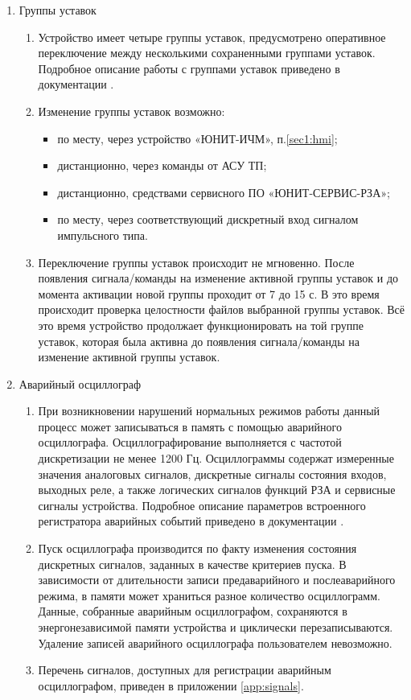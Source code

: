\begin{enumerate}
\item Группы уставок
\begin{enumerate}
\item Устройство имеет четыре группы уставок, предусмотрено оперативное переключение между несколькими сохраненными группами уставок. Подробное описание работы с группами уставок приведено в документации \ManualUnitGeneral.
\item Изменение группы уставок возможно:
\begin{itemize}
  \item по месту, через устройство «ЮНИТ-ИЧМ», п.\ref{sec1:hmi};
  \item дистанционно, через команды от АСУ ТП;
  \item дистанционно, средствами сервисного ПО «ЮНИТ-СЕРВИС-РЗА»;
  \item по месту, через соответствующий дискретный вход сигналом импульсного типа.
\end{itemize}
\item Переключение группы уставок происходит не мгновенно.
После появления сигнала/команды на изменение активной группы уставок и до момента активации новой группы проходит от 7 до 15 с.
В это время происходит проверка целостности файлов выбранной группы уставок.
Всё это время устройство продолжает функционировать на той группе уставок, которая была активна до появления сигнала/команды на изменение активной группы уставок.
\end{enumerate}

\item Аварийный осциллограф
\begin{enumerate}
\item При возникновении нарушений нормальных режимов работы данный процесс может записываться в память с помощью аварийного осциллографа.
Осциллографирование выполняется с частотой дискретизации не менее 1200 Гц.
Осциллограммы содержат измеренные значения аналоговых сигналов, дискретные сигналы состояния входов, выходных реле, а также логических сигналов функций РЗА и сервисные сигналы устройства.
Подробное описание параметров встроенного регистратора аварийных событий приведено в документации \ManualUnitGeneral.
\item Пуск осциллографа производится по факту изменения состояния дискретных сигналов, заданных в качестве критериев пуска.
В зависимости от длительности записи предаварийного и послеаварийного режима, в памяти может храниться разное количество осциллограмм.
Данные, собранные аварийным осциллографом, сохраняются в энергонезависимой памяти устройства и циклически перезаписываются.
Удаление записей аварийного осциллографа пользователем невозможно.
\item Перечень сигналов, доступных для регистрации аварийным осциллографом, приведен в приложении \ref{app:signals}.
\end{enumerate}


\end{enumerate}
